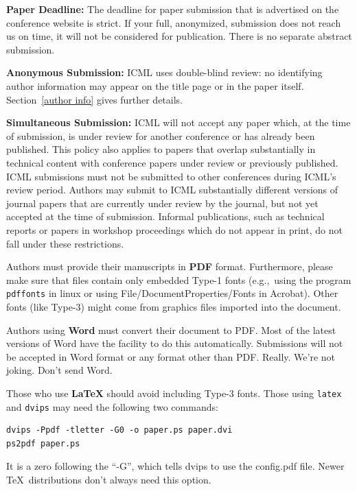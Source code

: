 \documentclass{article}
\begin{document}
\textbf{Paper Deadline:} The deadline for paper submission that is
advertised on the conference website is strict. If your full,
anonymized, submission does not reach us on time, it will not be
considered for publication. There is no separate abstract submission.

\textbf{Anonymous Submission:} ICML uses double-blind review: no identifying
author information may appear on the title page or in the paper
itself. Section~\ref{author info} gives further details.

\textbf{Simultaneous Submission:} ICML will not accept any paper which,
at the time of submission, is under review for another conference or
has already been published. This policy also applies to papers that
overlap substantially in technical content with conference papers
under review or previously published. ICML submissions must not be
submitted to other conferences during ICML's review period. Authors
may submit to ICML substantially different versions of journal papers
that are currently under review by the journal, but not yet accepted
at the time of submission. Informal publications, such as technical
reports or papers in workshop proceedings which do not appear in
print, do not fall under these restrictions.

\medskip

Authors must provide their manuscripts in \textbf{PDF} format.
Furthermore, please make sure that files contain only embedded Type-1 fonts
(e.g.,~using the program \texttt{pdffonts} in linux or using
File/DocumentProperties/Fonts in Acrobat). Other fonts (like Type-3)
might come from graphics files imported into the document.

Authors using \textbf{Word} must convert their document to PDF\@. Most
of the latest versions of Word have the facility to do this
automatically. Submissions will not be accepted in Word format or any
format other than PDF\@. Really. We're not joking. Don't send Word.

Those who use \textbf{\LaTeX} should avoid including Type-3 fonts.
Those using \texttt{latex} and \texttt{dvips} may need the following
two commands:

{\footnotesize
\begin{verbatim}
dvips -Ppdf -tletter -G0 -o paper.ps paper.dvi
ps2pdf paper.ps
\end{verbatim}}
It is a zero following the ``-G'', which tells dvips to use
the config.pdf file. Newer \TeX\ distributions don't always need this
option.
\end{document}

